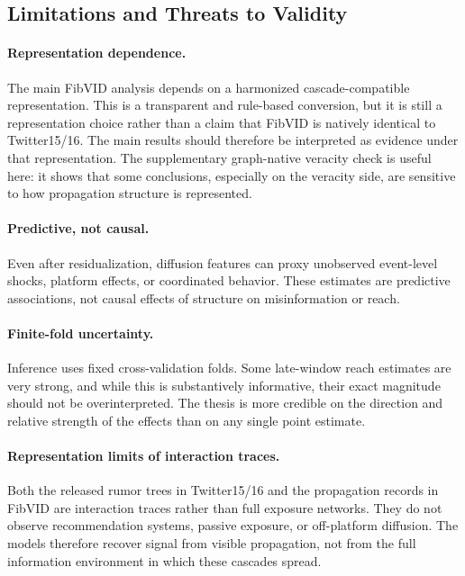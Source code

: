 \subsection{Limitations and Threats to Validity}
\paragraph{Representation dependence.}
The main FibVID analysis depends on a harmonized cascade-compatible representation. This is a transparent and rule-based conversion, but it is still a representation choice rather than a claim that FibVID is natively identical to Twitter15/16. The main results should therefore be interpreted as evidence under that representation. The supplementary graph-native veracity check is useful here: it shows that some conclusions, especially on the veracity side, are sensitive to how propagation structure is represented.

\paragraph{Predictive, not causal.}
Even after residualization, diffusion features can proxy unobserved event-level shocks, platform effects, or coordinated behavior. These estimates are predictive associations, not causal effects of structure on misinformation or reach.

\paragraph{Finite-fold uncertainty.}
Inference uses fixed cross-validation folds. Some late-window reach estimates are very strong, and while this is substantively informative, their exact magnitude should not be overinterpreted. The thesis is more credible on the direction and relative strength of the effects than on any single point estimate.

\paragraph{Representation limits of interaction traces.}
Both the released rumor trees in Twitter15/16 and the propagation records in FibVID are interaction traces rather than full exposure networks. They do not observe recommendation systems, passive exposure, or off-platform diffusion. The models therefore recover signal from visible propagation, not from the full information environment in which these cascades spread.

